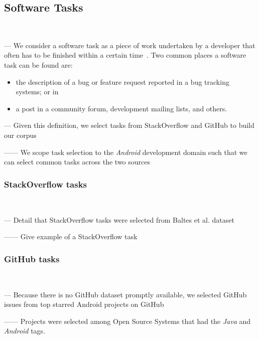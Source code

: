 \subsection{Software Tasks}
\textcolor{white}{force ident} %

--- We consider a software task as a piece of work undertaken by a developer that often has to be finished within a certain time~\cite{2004merriam}. 
Two common places a software task can be found are:

\begin{itemize}
    \item the description of a bug or feature request reported in a bug tracking systems; or in
    \item a post in a community forum, development mailing lists, and others.
\end{itemize}

\vspace{3mm}

--- Given this definition, we select tasks from StackOverflow and GitHub to build our corpus

------ We scope task selection to the \textit{Android} development domain such that we can select common tasks across the two sources \vspace{3mm}


\subsubsection{StackOverflow tasks}
\textcolor{white}{force ident} %

--- Detail that StackOverflow tasks were selected from Baltes et al. dataset~\cite{baltes2019-rep}

------ Give example of a StackOverflow task \vspace{5mm}

\subsubsection{GitHub tasks}
\textcolor{white}{force ident} %

--- Because there is no GitHub dataset promptly available, we selected GitHub issues from top starred Android projects on GitHub 

------ Projects were selected among Open Source Systems that had the \textit{Java} and \textit{Android} tags. 

